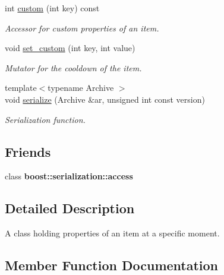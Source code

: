 \begin{DoxyCompactItemize}
int \hyperlink{classitem_1_1_item_properties_af81450b28e66fb82ca3f3c4d25143641}{custom} (int key) const
\begin{DoxyCompactList}\small\item\em Accessor for custom properties of an item. \end{DoxyCompactList}\item 
void \hyperlink{classitem_1_1_item_properties_a984264931e08aef21d41335afc3ba582}{set\+\_\+custom} (int key, int value)
\begin{DoxyCompactList}\small\item\em Mutator for the cooldown of the item. \end{DoxyCompactList}\item 
{\footnotesize template$<$typename Archive $>$ }\\void \hyperlink{classitem_1_1_item_properties_a0192995b931d99be5e8e5a1c5d24311d}{serialize} (Archive \&ar, unsigned int const version)
\begin{DoxyCompactList}\small\item\em Serialization function. \end{DoxyCompactList}\end{DoxyCompactItemize}
\subsection*{Friends}
\begin{DoxyCompactItemize}
\item 
\mbox{\label{classitem_1_1_item_properties_ac98d07dd8f7b70e16ccb9a01abf56b9c}} 
class {\bfseries boost\+::serialization\+::access}
\end{DoxyCompactItemize}


\subsection{Detailed Description}
A class holding properties of an item at a specific moment. 

\subsection{Member Function Documentation}
\mbox{\label{classitem_1_1_item_properties_a9d1fbd93e6ead012daf5d09a787c0514}} 
